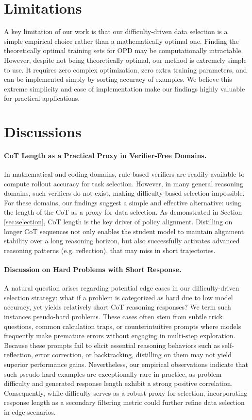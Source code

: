 \section{Limitations}

A key limitation of our work is that our difficulty-driven data selection is a simple empirical choice rather than a mathematically optimal one. Finding the theoretically optimal training sets for OPD may be computationally intractable. However, despite not being theoretically optimal, our method is extremely simple to use. It requires zero complex optimization, zero extra training parameters, and can be implemented simply by sorting accuracy of examples. We believe this extreme simplicity and ease of implementation make our findings highly valuable for practical applications.

\section{Discussions}

\paragraph{CoT Length as a Practical Proxy in Verifier-Free Domains.}
In mathematical and coding domains, rule-based verifiers are readily available to compute rollout accuracy for task selection. However, in many general reasoning domains, such verifiers do not exist, making difficulty-based selection impossible. For these domains, our findings suggest a simple and effective alternative: using the length of the CoT as a proxy for data selection. As demonstrated in Section \ref{sec:selection}, CoT length is the key driver of policy alignment. Distilling on longer CoT sequences not only enables the student model to maintain alignment stability over a long reasoning horizon, but also successfully activates advanced reasoning patterns (e.g. reflection), that may miss in short trajectories. 

\paragraph{Discussion on Hard Problems with Short Response.} 
A natural question arises regarding potential edge cases in our difficulty-driven selection strategy: what if a problem is categorized as hard due to low model accuracy, yet yields relatively short CoT reasoning responses? We term such instances pseudo-hard problems. These cases often stem from subtle trick questions, common calculation traps, or counterintuitive prompts where models frequently make premature errors without engaging in multi-step exploration. Because these prompts fail to elicit essential reasoning behaviors such as self-reflection, error correction, or backtracking, distilling on them may not yield superior performance gains. Nevertheless, our empirical observations indicate that such pseudo-hard examples are exceptionally rare in practice, as problem difficulty and generated response length exhibit a strong positive correlation. Consequently, while difficulty serves as a robust proxy for selection, incorporating response length as a secondary filtering metric could further refine data selection in edge scenarios.

